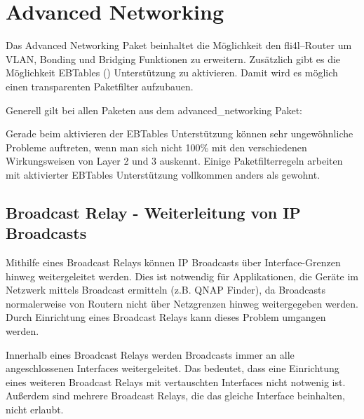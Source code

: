 
{
\section {Advanced Networking}
}

Das Advanced Networking Paket beinhaltet die Möglichkeit den
fli4l--Router um VLAN, Bonding und Bridging Funktionen zu
erweitern. Zusätzlich gibt es die Möglichkeit EBTables
() Unterstützung zu
aktivieren. Damit wird es möglich einen transparenten Paketfilter
aufzubauen.

Generell gilt bei allen Paketen aus dem advanced\_networking Paket:
\smallskip


Gerade beim aktivieren der EBTables Unterstützung können sehr
ungewöhnliche Probleme auftreten, wenn man sich nicht 100\% mit den
verschiedenen Wirkungsweisen von Layer 2 und 3 auskennt. Einige
Paketfilterregeln arbeiten mit aktivierter EBTables Unterstützung
vollkommen anders als gewohnt.

\subsection{Broadcast Relay - Weiterleitung von IP Broadcasts}

Mithilfe eines Broadcast Relays können IP Broadcasts über Interface-Grenzen
hinweg weitergeleitet werden. Dies ist notwendig für Applikationen, die Geräte
im Netzwerk mittels Broadcast ermitteln (z.B. QNAP Finder), da Broadcasts
normalerweise von Routern nicht über Netzgrenzen hinweg weitergegeben werden.
Durch Einrichtung eines Broadcast Relays kann dieses Problem umgangen werden.

Innerhalb eines Broadcast Relays werden Broadcasts immer an alle
angeschlossenen Interfaces weitergeleitet. Das bedeutet, dass eine
Einrichtung eines weiteren Broadcast Relays mit vertauschten Interfaces
nicht notwenig ist. Außerdem sind mehrere Broadcast Relays, die das gleiche
Interface beinhalten, nicht erlaubt.

